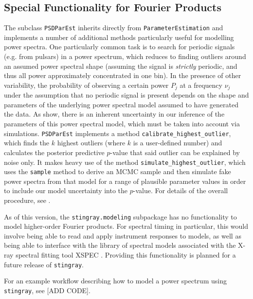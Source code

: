 \documentclass[12pt]{emulateapj}
\newcommand{\stingray}{\texttt{stingray}\xspace}
\begin{document}
\subsection{Special Functionality for Fourier Products}

The subclass \verb|PSDParEst| inherits directly from \verb|ParameterEstimation| and implements a number of additional methods particularly useful for modelling power spectra. One particularly common task is to search for periodic signals (e.g. from pulsars) in a power spectrum, which reduces to finding outliers around an assumed power spectral shape (assuming the signal is \textit{strictly} periodic, and thus all power approximately concentrated in one bin). In the presence of other variability, the probability of observing a certain power $P_j$ at a frequency $\nu_j$ under the assumption that no periodic signal is present depends on the shape and parameters of the underlying power spectral model assumed to have generated the data. As \citet{vaughan2010} show, there is an inherent uncertainty in our inference of the parameters of this power spectral model, which must be taken into account via simulations. \verb|PSDParEst| implements a method \verb|calibrate_highest_outlier|, which finds the $k$ highest outliers (where $k$ is a user-defined number) and calculates the posterior predictive $p$-value that said outlier can be explained by noise only. It makes heavy use of the method \verb|simulate_highest_outlier|, which uses the \verb|sample| method to derive an MCMC sample and then simulate fake power spectra from that model for a range of plausible parameter values in order to include our model uncertainty into the $p$-value. For details of the overall procedure, see \citet{vaughan2010}. 

As of this version, the \verb|stingray.modeling| subpackage has no functionality to model higher-order Fourier products. For spectral timing in particular, this would involve being able to read and apply instrument responses to models, as well as being able to interface with the library of spectral models associated with the X-ray spectral fitting tool XSPEC \citep{arnaud1996}. Providing this functionality is planned for a future release of \stingray. 

For an example workflow describing how to model a power spectrum using \stingray, see [ADD CODE].
\end{document}
